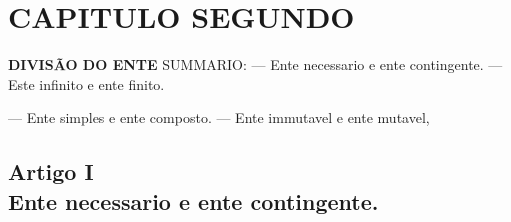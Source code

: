 

\chapter*{CAPITULO SEGUNDO}

 \textbf{DIVISÃO DO ENTE} \textsc{SUMMARIO}: --- Ente necessario e ente contingente. --- Este infinito e ente finito.

--- Ente simples e ente composto. --- Ente immutavel e ente mutavel,


\section*{Artigo I\\ Ente necessario e ente contingente.}

